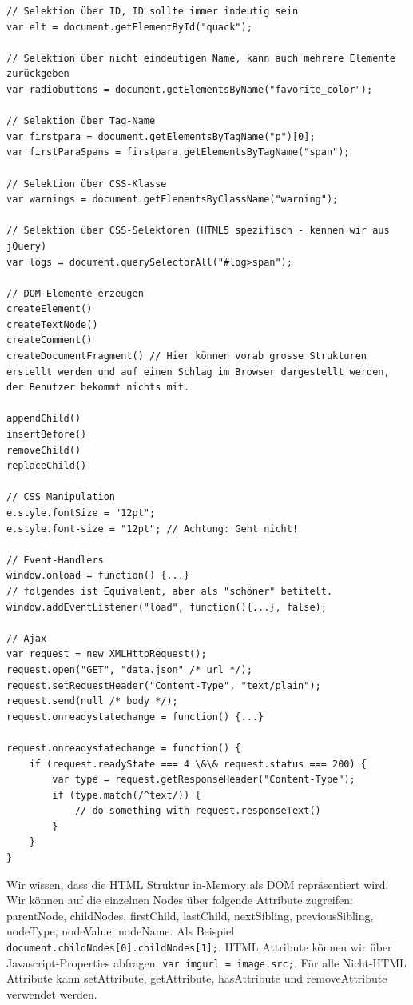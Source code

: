 \begin{lstlisting}[label=lst:dom-manipulation,caption=DOM Manipulation]
// Selektion über ID, ID sollte immer indeutig sein
var elt = document.getElementById("quack");

// Selektion über nicht eindeutigen Name, kann auch mehrere Elemente zurückgeben
var radiobuttons = document.getElementsByName("favorite_color");

// Selektion über Tag-Name
var firstpara = document.getElementsByTagName("p")[0];
var firstParaSpans = firstpara.getElementsByTagName("span");

// Selektion über CSS-Klasse
var warnings = document.getElementsByClassName("warning");

// Selektion über CSS-Selektoren (HTML5 spezifisch - kennen wir aus jQuery)
var logs = document.querySelectorAll("#log>span");

// DOM-Elemente erzeugen
createElement()
createTextNode()
createComment()
createDocumentFragment() // Hier können vorab grosse Strukturen erstellt werden und auf einen Schlag im Browser dargestellt werden, der Benutzer bekommt nichts mit.

appendChild()
insertBefore()
removeChild()
replaceChild()

// CSS Manipulation
e.style.fontSize = "12pt";
e.style.font-size = "12pt"; // Achtung: Geht nicht!

// Event-Handlers
window.onload = function() {...}
// folgendes ist Equivalent, aber als "schöner" betitelt.
window.addEventListener("load", function(){...}, false);

// Ajax
var request = new XMLHttpRequest();
request.open("GET", "data.json" /* url */);
request.setRequestHeader("Content-Type", "text/plain");
request.send(null /* body */);
request.onreadystatechange = function() {...}

request.onreadystatechange = function() {
	if (request.readyState === 4 \&\& request.status === 200) {
		var type = request.getResponseHeader("Content-Type");
		if (type.match(/^text/)) {
			// do something with request.responseText()
		}
	}
}
\end{lstlisting}

Wir wissen, dass die HTML Struktur in-Memory als DOM repräsentiert wird. Wir können auf die einzelnen Nodes über folgende Attribute zugreifen: parentNode, childNodes, firstChild, lastChild, nextSibling, previousSibling, nodeType, nodeValue, nodeName. Als Beispiel \lstinline|document.childNodes[0].childNodes[1];|. HTML Attribute können wir über Javascript-Properties abfragen: \lstinline|var imgurl = image.src;|. Für alle Nicht-HTML Attribute kann setAttribute, getAttribute, hasAttribute und removeAttribute verwendet werden.

